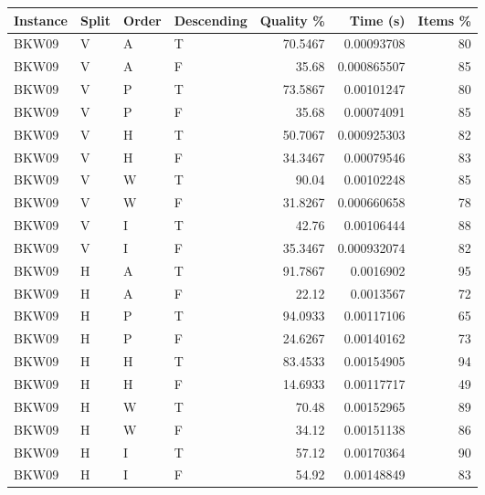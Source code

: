 \begin{tabular}{llllrrr}
    \hline
    Instance & Split & Order & Descending & Quality \% & Time (s)    & Items \% \\
    \hline
    BKW09    & V     & A     & T          & 70.5467    & 0.00093708  & 80       \\
    BKW09    & V     & A     & F          & 35.68      & 0.000865507 & 85       \\
    BKW09    & V     & P     & T          & 73.5867    & 0.00101247  & 80       \\
    BKW09    & V     & P     & F          & 35.68      & 0.00074091  & 85       \\
    BKW09    & V     & H     & T          & 50.7067    & 0.000925303 & 82       \\
    BKW09    & V     & H     & F          & 34.3467    & 0.00079546  & 83       \\
    BKW09    & V     & W     & T          & 90.04      & 0.00102248  & 85       \\
    BKW09    & V     & W     & F          & 31.8267    & 0.000660658 & 78       \\
    BKW09    & V     & I     & T          & 42.76      & 0.00106444  & 88       \\
    BKW09    & V     & I     & F          & 35.3467    & 0.000932074 & 82       \\
    BKW09    & H     & A     & T          & 91.7867    & 0.0016902   & 95       \\
    BKW09    & H     & A     & F          & 22.12      & 0.0013567   & 72       \\
    BKW09    & H     & P     & T          & 94.0933    & 0.00117106  & 65       \\
    BKW09    & H     & P     & F          & 24.6267    & 0.00140162  & 73       \\
    BKW09    & H     & H     & T          & 83.4533    & 0.00154905  & 94       \\
    BKW09    & H     & H     & F          & 14.6933    & 0.00117717  & 49       \\
    BKW09    & H     & W     & T          & 70.48      & 0.00152965  & 89       \\
    BKW09    & H     & W     & F          & 34.12      & 0.00151138  & 86       \\
    BKW09    & H     & I     & T          & 57.12      & 0.00170364  & 90       \\
    BKW09    & H     & I     & F          & 54.92      & 0.00148849  & 83       \\

\end{tabular}
